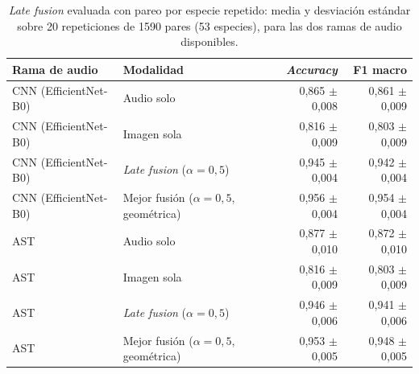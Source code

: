 \begin{table}[!htb]
  \centering\small
  \caption{\textit{Late fusion} evaluada con pareo por especie repetido: media y desviación estándar sobre 20 repeticiones de 1590 pares (53 especies), para las dos ramas de audio disponibles.}
  \label{tab:fusion-summary}
  \footnotesize
  \begin{tabular}{@{}l l r r@{}}
    \toprule
    Rama de audio & Modalidad & \textit{Accuracy} & F1 macro \\
    \midrule
    CNN (EfficientNet-B0) & Audio solo & 0,865 $\pm$ 0,008 & 0,861 $\pm$ 0,009 \\
    CNN (EfficientNet-B0) & Imagen sola & 0,816 $\pm$ 0,009 & 0,803 $\pm$ 0,009 \\
    CNN (EfficientNet-B0) & \textit{Late fusion} ($\alpha=0{,}5$) & 0,945 $\pm$ 0,004 & 0,942 $\pm$ 0,004 \\
    CNN (EfficientNet-B0) & Mejor fusión ($\alpha=0{,}5$, geométrica) & 0,956 $\pm$ 0,004 & 0,954 $\pm$ 0,004 \\
    AST & Audio solo & 0,877 $\pm$ 0,010 & 0,872 $\pm$ 0,010 \\
    AST & Imagen sola & 0,816 $\pm$ 0,009 & 0,803 $\pm$ 0,009 \\
    AST & \textit{Late fusion} ($\alpha=0{,}5$) & 0,946 $\pm$ 0,006 & 0,941 $\pm$ 0,006 \\
    AST & Mejor fusión ($\alpha=0{,}5$, geométrica) & 0,953 $\pm$ 0,005 & 0,948 $\pm$ 0,005 \\
    \bottomrule
  \end{tabular}
\end{table}

